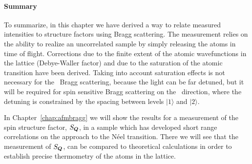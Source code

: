 %
 
\vspace{3em} 

\paragraph{Summary} 

To summarize,  in this chapter we have derived a way to relate measured
intensities to structure factors using Bragg scattering.  The measurement
relies on the ability to realize an uncorrelated sample by simply releasing the
atoms in time of flight.  Corrections due to the finite extent of the atomic
wavefunctions in the lattice (Debye-Waller factor) and due to the saturation of
the atomic transition have been derived.   Taking into account saturation
effects is not necessary for the \zoz\ Bragg scattering, because the light can
be far detuned, but it will be required for spin sensitive Bragg scattering on
the \hhh\ direction, where the detuning is constrained by the spacing between
levels $|1\rangle$ and $|2\rangle$. 

In Chapter~\ref{chap:afmbragg} we will show the results for a measurement of
the spin structure factor, $S_{\bm{Q}}$, in a sample which has developed short
range correlations on the approach to the N\'{e}el transition.  There we will
see that the measurement of $S_{\bm{Q}}$, can be compared to theoretical
calculations in order to establish precise thermometry of the atoms in the
lattice. 

 



